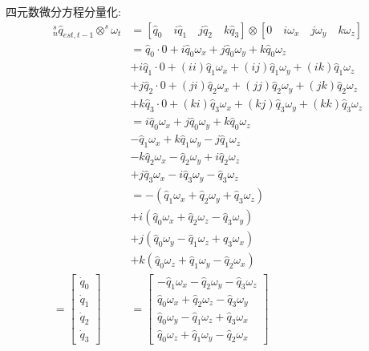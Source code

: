 \documentclass[12pt,a4paper]{article}
\begin{document}
四元数微分方程分量化:
\begin{equation} \label{微分方程分量化}
    \begin{aligned}
        {^s_n\hat{q}_{est,t-1}}\otimes^s\omega_t
        &= [\hat{q}_0\quad i\hat{q}_1\quad j\hat{q}_2\quad k\hat{q}_3] \otimes [0\quad i\omega_{x}\quad j\omega_{y}\quad k\omega_{z}] \\
        &= \hat{q}_0 \cdot 0 + i    \hat{q}_0 \omega_x + j    \hat{q}_0 \omega_y + k    \hat{q}_0 \omega_z \\
      &+ i \hat{q}_1 \cdot 0 + (ii) \hat{q}_1 \omega_x + (ij) \hat{q}_1 \omega_y + (ik) \hat{q}_1 \omega_z \\
      &+ j \hat{q}_2 \cdot 0 + (ji) \hat{q}_2 \omega_x + (jj) \hat{q}_2 \omega_y + (jk) \hat{q}_2 \omega_z \\
      &+ k \hat{q}_3 \cdot 0 + (ki) \hat{q}_3 \omega_x + (kj) \hat{q}_3 \omega_y + (kk) \hat{q}_3 \omega_z \\
        &=   i \hat{q}_0 \omega_x + j \hat{q}_0 \omega_y + k \hat{q}_0 \omega_z \\
        &  -   \hat{q}_1 \omega_x + k \hat{q}_1 \omega_y - j \hat{q}_1 \omega_z \\
        &  - k \hat{q}_2 \omega_x -   \hat{q}_2 \omega_y + i \hat{q}_2 \omega_z \\
        &  + j \hat{q}_3 \omega_x - i \hat{q}_3 \omega_y -   \hat{q}_3 \omega_z \\
        &= -(\hat{q}_1 \omega_x + \hat{q}_2 \omega_y + \hat{q}_3 \omega_z) \\
        &+ i(\hat{q}_0 \omega_x + \hat{q}_2 \omega_z - \hat{q}_3 \omega_y) \\
        &+ j(\hat{q}_0 \omega_y - \hat{q}_1 \omega_z + \hat{q}_3 \omega_x) \\
        &+ k(\hat{q}_0 \omega_z + \hat{q}_1 \omega_y - \hat{q}_2 \omega_x) \\ 
        =\left[\begin{array}{c}
                \dot{q}_{0} \\
                \dot{q}_{1} \\
                \dot{q}_{2} \\
                \dot{q}_{3}
        \end{array}\right]
        &=\left[\begin{array}{c}
        - \hat{q}_1 \omega_x - \hat{q}_2 \omega_y - \hat{q}_3 \omega_z \\
          \hat{q}_0 \omega_x + \hat{q}_2 \omega_z - \hat{q}_3 \omega_y \\
          \hat{q}_0 \omega_y - \hat{q}_1 \omega_z + \hat{q}_3 \omega_x \\
          \hat{q}_0 \omega_z + \hat{q}_1 \omega_y - \hat{q}_2 \omega_x
        \end{array}\right]
    \end{aligned}
\end{equation}
\end{document}
